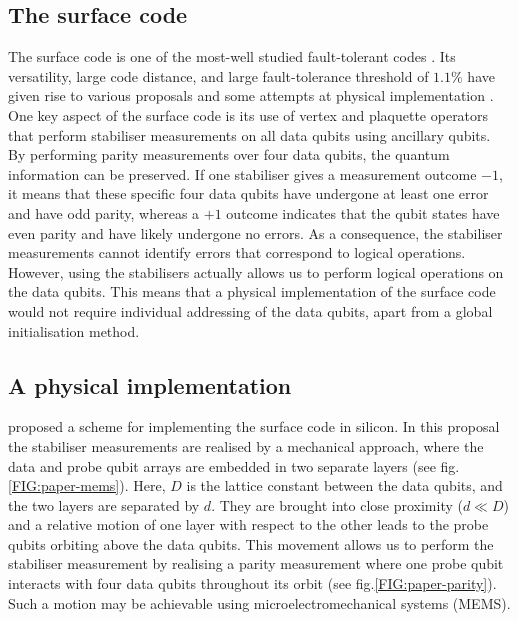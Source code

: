 \subsection{The surface code}
The surface code is one of the most-well studied fault-tolerant codes \cite{Wang2011,Fowler2012}. Its versatility, large code distance, and large fault-tolerance threshold of $1.1\%$ have given rise to various proposals \cite{Fowler2012,Pica2014,Tosi2015,Hill2015,OGorman2016} and some attempts at physical implementation \cite{Barends2014,Kelly2015}. One key aspect of the surface code is its use of vertex and plaquette operators that perform stabiliser measurements on all data qubits using ancillary qubits. By performing parity measurements over four data qubits, the quantum information can be preserved. If one stabiliser gives a measurement outcome $-1$, it means that these specific four data qubits have undergone at least one error and have odd parity, whereas a $+1$ outcome indicates that the qubit states have even parity and have likely undergone no errors. As a consequence, the stabiliser measurements cannot identify errors that correspond to logical operations. However, using the stabilisers actually allows us to perform logical operations on the data qubits. This means that a physical implementation of the surface code would not require individual addressing of the data qubits, apart from a global initialisation method. 







\subsection{A physical implementation} \label{sec:PhysicalImplementation}
\citet{OGorman2016} proposed a scheme for implementing the surface code in silicon. In this proposal the stabiliser measurements are realised by a mechanical approach, where the data and probe qubit arrays are embedded in two separate layers (see fig.\@ \ref{FIG:paper-mems}). Here, $D$ is the lattice constant between the data qubits, and the two layers are separated by $d$. They are brought into close proximity ($d\ll D$) and a relative motion of one layer with respect to the other leads to the probe qubits orbiting above the data qubits. This movement allows us to perform the stabiliser measurement by realising a parity measurement where one probe qubit interacts with four data qubits throughout its orbit (see fig.\@ \ref{FIG:paper-parity}). Such a motion may be achievable using microelectromechanical systems (MEMS).



